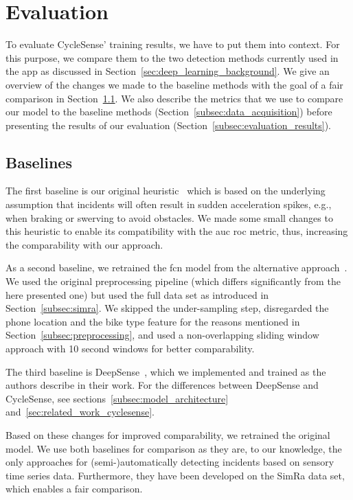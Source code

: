 \section{Evaluation}
\label{sec:evaluation_cyclesense}
To evaluate CycleSense' training results, we have to put them into context.
For this purpose, we compare them to the two detection methods currently used in the app as discussed in Section~\ref{sec:deep_learning_background}.
We give an overview of the changes we made to the baseline methods with the goal of a fair comparison in Section~\ref{subsec:baselines}.
We also describe the metrics that we use to compare our model to the baseline methods (Section~\ref{subsec:data_acquisition}) before presenting the results of our evaluation (Section~\ref{subsec:evaluation_results}).


\subsection{Baselines}
\label{subsec:baselines}
The first baseline is our original heuristic~\cite{karakaya2020simra} which is based on the underlying assumption that incidents will often result in sudden acceleration spikes, e.g., when braking or swerving to avoid obstacles.
We made some small changes to this heuristic to enable its compatibility with the \ac{auc} \ac{roc} metric, thus, increasing the comparability with our approach.

As a second baseline, we retrained the \ac{fcn} model from the alternative approach~\cite{sanchez2020detecting}.
We used the original preprocessing pipeline (which differs significantly from the here presented one) but used the full data set as introduced in Section~\ref{subsec:simra}.
We skipped the under-sampling step, disregarded the phone location and the bike type feature for the reasons mentioned in Section~\ref{subsec:preprocessing}, and used a non-overlapping sliding window approach with 10 second windows for better comparability.

The third baseline is DeepSense~\cite{yao2017deepsense}, which we implemented and trained as the authors describe in their work.
For the differences between DeepSense and CycleSense, see sections~\ref{subsec:model_architecture} and~\ref{sec:related_work_cyclesense}.

Based on these changes for improved comparability, we retrained the original model.
We use both baselines for comparison as they are, to our knowledge, the only approaches for (semi-)automatically detecting incidents based on sensory time series data.
Furthermore, they have been developed on the SimRa data set, which enables a fair comparison.

